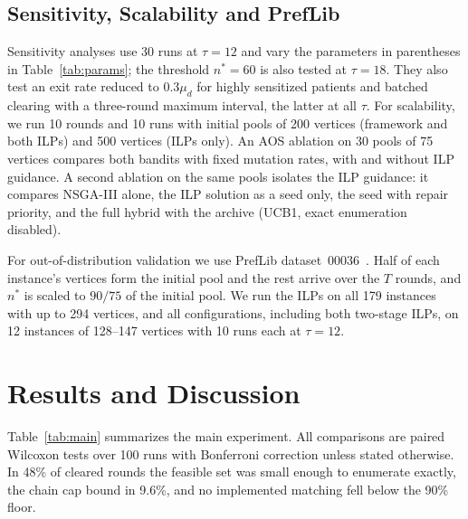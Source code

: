 \documentclass[journal]{IEEEtran}
\begin{document}
\subsection{Sensitivity, Scalability and PrefLib}
\label{sec:exp:ood}

Sensitivity analyses use 30 runs at $\tau = 12$ and vary the
parameters in parentheses in Table~\ref{tab:params}; the threshold
$n^* = 60$ is also tested at $\tau = 18$. They also test an exit rate
reduced to $0.3\mu_d$ for highly sensitized patients and batched
clearing with a three-round maximum interval, the latter at all
$\tau$. For scalability, we run 10 rounds and 10 runs with initial
pools of 200 vertices (framework and both ILPs) and 500 vertices
(ILPs only). An AOS ablation on 30 pools of 75 vertices compares both
bandits with fixed mutation rates, with and without ILP guidance. A
second ablation on the same pools isolates the ILP guidance: it
compares NSGA-III alone, the ILP solution as a seed only, the seed with
repair priority, and the full hybrid with the archive (UCB1, exact
enumeration disabled).

For out-of-distribution validation we use PrefLib
dataset~00036~\cite{mattei2013preflib}. Half of each instance's
vertices form the initial pool and the rest arrive over the $T$
rounds, and $n^*$ is scaled to $90/75$ of the initial pool. We run the
ILPs on all 179 instances with up to 294 vertices, and all
configurations, including both two-stage ILPs, on 12 instances of
128--147 vertices with 10 runs each at $\tau = 12$.

\section{Results and Discussion}
\label{sec:results}

Table~\ref{tab:main} summarizes the main experiment. All comparisons
are paired Wilcoxon tests over 100 runs with Bonferroni correction
unless stated otherwise. In 48\% of cleared rounds the feasible set
was small enough to enumerate exactly, the chain cap bound in 9.6\%,
and no implemented matching fell below the 90\% floor.
\end{document}
